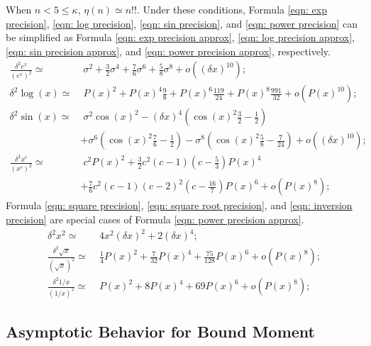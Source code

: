 \documentclass[twoside]{article}
\numberwithin{equation}{section}
\begin{document}
When $n < 5 \leq \kappa$, $\eta(n) \simeq n!!$. 
Under these conditions, Formula \eqref{eqn: exp precision}, \eqref{eqn: log precision}, \eqref{eqn: sin precision}, and \eqref{eqn: power precision} can be simplified as Formula \eqref{eqn: exp precision approx}, \eqref{eqn: log precision approx}, \eqref{eqn: sin precision approx}, and \eqref{eqn: power precision approx}, respectively.
\begin{align}
\label{eqn: exp precision approx}
\frac{\delta^2 e^x}{(e^x)^2} \simeq&\; \sigma^2 + \frac{3}{2} \sigma^4 + \frac{7}{6} \sigma^6 + \frac{5}{8} \sigma^8 + o((\delta x)^{10}); \\
\label{eqn: log precision approx}
\delta^2 \log(x) \simeq&\; P(x)^2 + P(x)^4 \frac{9}{8}  + P(x)^6 \frac{119}{24} + P(x)^8 \frac{991}{32} + o(P(x)^{10}); \\
\label{eqn: sin precision approx}
\delta^2 \sin(x) \simeq&\;  \sigma^2 \cos(x)^2 - (\delta x)^4 (\cos(x)^2 \frac{3}{2} - \frac{1}{2}) \nonumber \\
 	& + \sigma^6 (\cos(x)^2 \frac{7}{6} - \frac{1}{2}) - \sigma^8 (\cos(x)^2 \frac{5}{8} - \frac{7}{24}) + o((\delta x)^{10}); \\
\label{eqn: power precision approx}
\frac{\delta^2 x^c}{(x^c)^2} \simeq&\; c^2 P(x)^2 + \frac{3}{2} c^2 (c-1) (c - \frac{5}{3}) P(x)^4 \nonumber \\
	& + \frac{7}{6} c^2 (c-1) (c-2)^2 (c - \frac{16}{7}) P(x)^6 + o(P(x)^{8});
\end{align}
Formula \eqref{eqn: square precision}, \eqref{eqn: square root precision}, and \eqref{eqn: inversion precision} are special cases of Formula \eqref{eqn: power precision approx}.
\begin{align}
\label{eqn: square precision}
\delta^2 x^2 \simeq&\; 4 x^2 (\delta x)^2 + 2  (\delta x)^4; \\
\label{eqn: square root precision}
\frac{\delta^2 \sqrt{x}}{(\sqrt{x})^2} \simeq&\; \frac{1}{4} P(x)^2 + \frac{7}{32} P(x)^4 + \frac{75}{128} P(x)^6 + o(P(x)^8); \\
\label{eqn: inversion precision}
\frac{\delta^2 1/x}{(1/x)^2} \simeq&\; P(x)^2 + 8 P(x)^4 + 69 P(x)^6 + o(P(x)^8);
\end{align}




\subsection{Asymptotic Behavior for Bound Moment}
\end{document}
